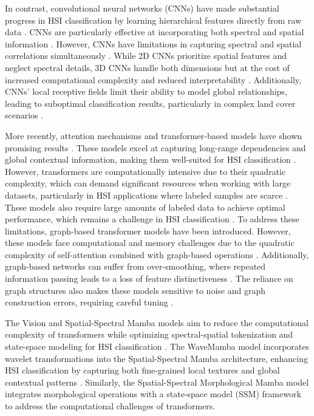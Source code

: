 \documentclass[journal]{IEEEtran}
\begin{document}
In contrast, convolutional neural networks (CNNs) have made substantial progress in HSI classification by learning hierarchical features directly from raw data \cite{8488544, 9903062, deng2024rustqnet,8602463,li2024learning}. CNNs are particularly effective at incorporating both spectral and spatial information \cite{9307220, 8472143}. However, CNNs have limitations in capturing spectral and spatial correlations simultaneously \cite{9542960}. While 2D CNNs prioritize spatial features and neglect spectral details, 3D CNNs handle both dimensions but at the cost of increased computational complexity and reduced interpretability \cite{ahmad2024compr, WANG202336}. Additionally, CNNs' local receptive fields limit their ability to model global relationships, leading to suboptimal classification results, particularly in complex land cover scenarios \cite{MARTINS202056,wu2022uiu}.

More recently, attention mechanisms and transformer-based models have shown promising results \cite{yu2024hypersinet, 10399798, li2024s2mae,li2024casformer}. These models excel at capturing long-range dependencies and global contextual information, making them well-suited for HSI classification \cite{10604879}. However, transformers are computationally intensive due to their quadratic complexity, which can demand significant resources when working with large datasets, particularly in HSI applications where labeled samples are scarce \cite{10491347}. These models also require large amounts of labeled data to achieve optimal performance, which remains a challenge in HSI classification \cite{10440631, 10681622}. To address these limitations, graph-based transformer models have been introduced. However, these models face computational and memory challenges due to the quadratic complexity of self-attention combined with graph-based operations \cite{10638815, 10574288}. Additionally, graph-based networks can suffer from over-smoothing, where repeated information passing leads to a loss of feature distinctiveness \cite{10485641}. The reliance on graph structures also makes these models sensitive to noise and graph construction errors, requiring careful tuning \cite{10504544}.

The Vision and Spatial-Spectral Mamba models aim to reduce the computational complexity of transformers while optimizing spectral-spatial tokenization and state-space modeling for HSI classification \cite{10604894, ahmad2024multihead, WANG2024104092, SHI2024109669, yao2024spectralmamba}. The WaveMamba model incorporates wavelet transformations into the Spatial-Spectral Mamba architecture, enhancing HSI classification by capturing both fine-grained local textures and global contextual patterns \cite{10767233}. Similarly, the Spatial-Spectral Morphological Mamba model \cite{ahmad2024morphologicalmamba} integrates morphological operations with a state-space model (SSM) framework to address the computational challenges of transformers.
\end{document}
